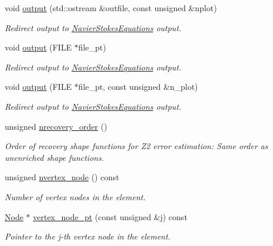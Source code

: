 \begin{DoxyCompactItemize}
void \hyperlink{classoomph_1_1TCrouzeixRaviartElement_ad8228b4af3ec6e393b0d23d23bfaf1ea}{output} (std\+::ostream \&outfile, const unsigned \&nplot)
\begin{DoxyCompactList}\small\item\em Redirect output to \hyperlink{classoomph_1_1NavierStokesEquations}{Navier\+Stokes\+Equations} output. \end{DoxyCompactList}\item 
void \hyperlink{classoomph_1_1TCrouzeixRaviartElement_acfd994f524621438f12661ee012a126a}{output} (F\+I\+LE $\ast$file\+\_\+pt)
\begin{DoxyCompactList}\small\item\em Redirect output to \hyperlink{classoomph_1_1NavierStokesEquations}{Navier\+Stokes\+Equations} output. \end{DoxyCompactList}\item 
void \hyperlink{classoomph_1_1TCrouzeixRaviartElement_af32d21ac6a3e2909b40c3b2ac0c48430}{output} (F\+I\+LE $\ast$file\+\_\+pt, const unsigned \&n\+\_\+plot)
\begin{DoxyCompactList}\small\item\em Redirect output to \hyperlink{classoomph_1_1NavierStokesEquations}{Navier\+Stokes\+Equations} output. \end{DoxyCompactList}\item 
unsigned \hyperlink{classoomph_1_1TCrouzeixRaviartElement_ad4315b4fa098fae83fb82556f90145dd}{nrecovery\+\_\+order} ()
\begin{DoxyCompactList}\small\item\em Order of recovery shape functions for Z2 error estimation\+: Same order as unenriched shape functions. \end{DoxyCompactList}\item 
unsigned \hyperlink{classoomph_1_1TCrouzeixRaviartElement_a7d150a3bf2b048eb4fc99222822301b0}{nvertex\+\_\+node} () const
\begin{DoxyCompactList}\small\item\em Number of vertex nodes in the element. \end{DoxyCompactList}\item 
\hyperlink{classoomph_1_1Node}{Node} $\ast$ \hyperlink{classoomph_1_1TCrouzeixRaviartElement_af40208fa7a6f30f2b4dc9c3a19d645e2}{vertex\+\_\+node\+\_\+pt} (const unsigned \&j) const
\begin{DoxyCompactList}\small\item\em Pointer to the j-\/th vertex node in the element. \end{DoxyCompactList}\item 

\end{DoxyCompactItemize}
